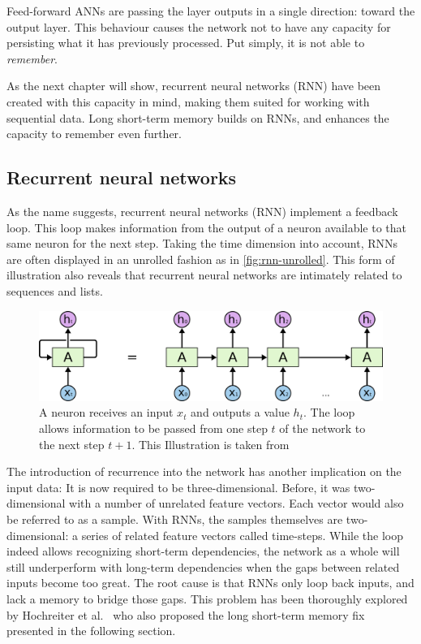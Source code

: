 Feed-forward ANNs are passing the layer outputs in a single direction: toward the output layer. This behaviour causes the network not to have any capacity for persisting what it has previously processed. Put simply, it is not able to \textit{remember}.

As the next chapter will show, recurrent neural networks (RNN) have been created with this capacity in mind, making them suited for working with sequential data. Long short-term memory builds on RNNs, and enhances the capacity to remember even further.

\subsection{Recurrent neural networks}\label{sec:recurrent-networks}
As the name suggests, recurrent neural networks (RNN) implement a feedback loop. This loop makes information from the output of a neuron available to that same neuron for the next step. Taking the time dimension into account, RNNs are often displayed in an unrolled fashion as in \autoref{fig:rnn-unrolled}. This form of illustration also reveals that recurrent neural networks are intimately related to sequences and lists.

\begin{figure}[!htb]
    \centering
    \includegraphics[width=.9\textwidth]{gfx/rnn-unrolled.png}
    \caption{A neuron receives an input $x_t$ and outputs a value $h_t$. The loop allows information to be passed from one step $t$ of the network to the next step $t+1$. This Illustration is taken from \cite{web:colah}}
    \label{fig:rnn-unrolled}
\end{figure}

The introduction of recurrence into the network has another implication on the input data: It is now required to be three-dimensional. Before, it was two-dimensional with a number of unrelated feature vectors. Each vector would also be referred to as a sample. With RNNs, the samples themselves are two-dimensional: a series of related feature vectors called time-steps.
While the loop indeed allows recognizing short-term dependencies, the network as a whole will still underperform with long-term dependencies when the gaps between related inputs become too great. The root cause is that RNNs only loop back inputs, and lack a memory to bridge those gaps. This problem has been thoroughly explored by Hochreiter et al.~\cite{hochreiter1991untersuchungen} who also proposed the long short-term memory fix presented in the following section.

